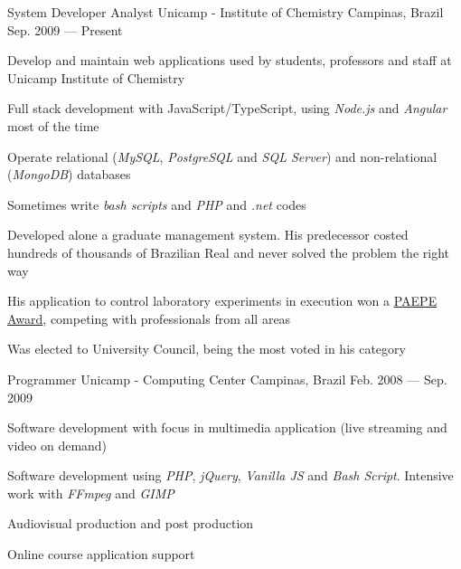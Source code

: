 

\begin{cventries}

  \cventry
    {System Developer Analyst} %
    {Unicamp - Institute of Chemistry} %
    {Campinas, Brazil} %
    {Sep. 2009 — Present} %
    {
      \begin{cvitems} %
        \item {Develop and maintain web applications used by students, professors and staff at Unicamp Institute of Chemistry}
        \item {Full stack development with JavaScript/TypeScript, using \textit{Node.js} and \textit{Angular} most of the time}
        \item {Operate relational (\textit{MySQL}, \textit{PostgreSQL} and \textit{SQL Server}) and non-relational (\textit{MongoDB}) databases}
        \item {Sometimes write \textit{bash scripts} and \textit{PHP} and \textit{.net} codes}
        \item {Developed alone a graduate management system. His predecessor costed hundreds of thousands of Brazilian Real and never solved the problem the right way}
        \item {His application to control laboratory experiments in execution won a \href{https://www.dgrh.unicamp.br/premiopaepe}{PAEPE Award}, competing with professionals from all areas}
        \item {Was elected to University Council, being the most voted in his category}
      \end{cvitems}
    }

  \cventry
    {Programmer} %
    {Unicamp - Computing Center} %
    {Campinas, Brazil} %
    {Feb. 2008 — Sep. 2009} %
    {
      \begin{cvitems} %
        \item {Software development with focus in multimedia application (live streaming and video on demand)}
        \item {Software development using \textit{PHP}, \textit{jQuery}, \textit{Vanilla JS} and \textit{Bash Script}. Intensive work with \textit{FFmpeg} and \textit{GIMP}}
        \item {Audiovisual production and post production}
        \item {Online course application support}
      \end{cvitems}
    }

\end{cventries}
